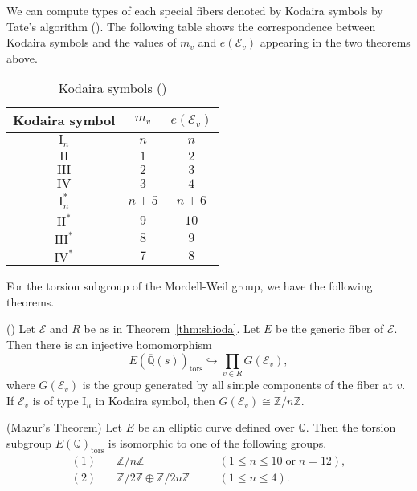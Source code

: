 \documentclass[main]{subfiles}
\begin{document}
We can compute types of each special fibers denoted by Kodaira symbols by Tate's algorithm (\cite[IV \S 9]{ref:advancedaec}).
The following table shows the correspondence between Kodaira symbols and the values of $m_v$ and $e(\mathcal{E}_v)$ appearing in the two theorems above.

\begin{table}[H]
    \centering
    \caption{Kodaira symbols (\cite[pp.136-137 付録2]{ref:shioda1993})}
    \begin{tabular}{|c|c|c|}
        \hline
        Kodaira symbol & $m_v$ & $e(\mathcal{E}_v)$ \\
        \hline
        $\mathrm{I}_n$   & $n$   & $n$                \\
        $\mathrm{II}$    & $1$   & $2$                \\
        $\mathrm{III}$   & $2$   & $3$                \\
        $\mathrm{IV}$    & $3$   & $4$                \\
        $\mathrm{I}_n^*$ & $n+5$ & $n+6$              \\
        $\mathrm{II}^*$  & $9$   & $10$               \\
        $\mathrm{III}^*$ & $8$   & $9$                \\
        $\mathrm{IV}^*$  & $7$   & $8$                \\
        \hline
    \end{tabular}
    \label{tab:kodaira}
\end{table}

For the torsion subgroup of the Mordell-Weil group, we have the following theorems.
\begin{thm}{(\cite[Lem.3.5]{ref:naskrecki2013})}
    \label{thm:torsion}
    Let $\mathcal{E}$ and $R$ be as in Theorem~\ref{thm:shioda}.
    Let $E$ be the generic fiber of $\mathcal{E}$.
    Then there is an injective homomorphism
    \begin{equation*}
        E(\overline{\mathbb{Q}}(s))_{\text{tors}} \hookrightarrow \prod_{v \in R} G(\mathcal{E}_{v}),
    \end{equation*}
    where $G(\mathcal{E}_{v})$ is the group generated by all simple components of the fiber at $v$.
    If $\mathcal{E}_{v}$ is of type $\mathrm{I}_n$ in Kodaira symbol, then $G(\mathcal{E}_{v}) \cong \mathbb{Z} / n \mathbb{Z}$.
\end{thm}

\begin{thm}{(Mazur's Theorem)}
    \label{thm:mazur}
    Let $E$ be an elliptic curve defined over $\mathbb{Q}$.
    Then the torsion subgroup $E(\mathbb{Q})_{\text{tors}}$ is isomorphic to one of the following groups.
    \begin{align*}
        (1) & \quad \mathbb{Z} / n \mathbb{Z} \quad                                   &  & (1 \leq n \leq 10 \; \text{or}\; n = 12), \\
        (2) & \quad \mathbb{Z} / 2 \mathbb{Z} \oplus \mathbb{Z} / 2n \mathbb{Z} \quad &  & (1 \leq n \leq 4).
    \end{align*}
\end{thm}
\end{document}
